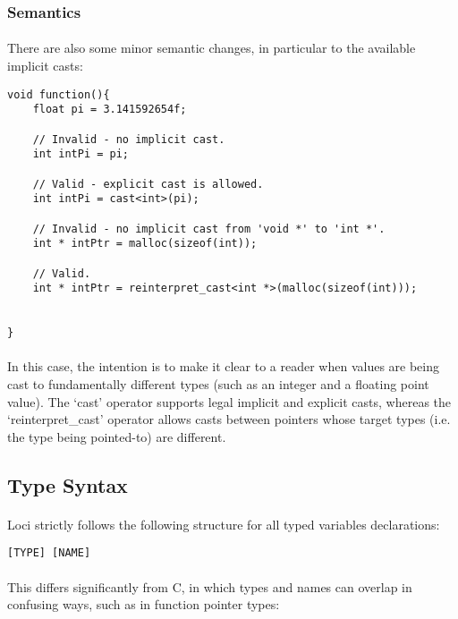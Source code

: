 \documentclass[12pt,twoside,notitlepage]{report}
\begin{document}
\subsubsection{Semantics}

\paragraph{}
There are also some minor semantic changes, in particular to the available implicit casts:


\begin{lstlisting}
void function(){
	float pi = 3.141592654f;
	
	// Invalid - no implicit cast.
	int intPi = pi;
	
	// Valid - explicit cast is allowed.
	int intPi = cast<int>(pi);
	
	// Invalid - no implicit cast from 'void *' to 'int *'.
	int * intPtr = malloc(sizeof(int));
	
	// Valid.
	int * intPtr = reinterpret_cast<int *>(malloc(sizeof(int)));
	
	
}
\end{lstlisting}


\paragraph{}
In this case, the intention is to make it clear to a reader when values are being cast to fundamentally different types (such as an integer and a floating point value). The `cast' operator supports legal implicit and explicit casts, whereas the `reinterpret\_cast' operator allows casts between pointers whose target types (i.e. the type being pointed-to) are different.

\clearpage

\subsection{Type Syntax}

\paragraph{}
Loci strictly follows the following structure for all typed variables declarations:


\begin{lstlisting}
[TYPE] [NAME]
\end{lstlisting}


\paragraph{}
This differs significantly from C, in which types and names can overlap in confusing ways, such as in function pointer types:
\end{document}

